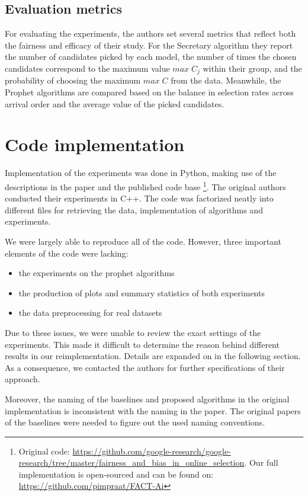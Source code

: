 \subsection{Evaluation metrics}\label{section:evluation_metrics}
For evaluating the experiments, the authors set several metrics that reflect both the fairness and efficacy of their study. For the Secretary algorithm they report the number of candidates picked by each model, the number of times the chosen candidates correspond to the maximum value $max\;C_j$ within their group, and the probability of choosing the maximum $max\;C$ from the data. Meanwhile, the Prophet algorithms are compared based on the balance in selection rates across arrival order and the average value of the picked candidates.


\section{Code implementation}
Implementation of the experiments was done in Python, making use of the descriptions in the paper and the published code base \footnote{Original code:  \url{https://github.com/google-research/google-research/tree/master/fairness_and_bias_in_online_selection}. Our full implementation is open-sourced and can be found on: \url{https://github.com/pimpraat/FACT-Ai}}. The original authors conducted their experiments in C++. The code was factorized neatly into different files for retrieving the data, implementation of algorithms and experiments.

We were largely able to reproduce all of the code. However, three important elements of the code were lacking:
\begin{itemize}
    \item the experiments on the prophet algorithms
    \item the production of plots and summary statistics of both experiments
    \item the data preprocessing for real datasets
\end{itemize}
Due to these issues, we were unable to review the exact settings of the experiments. This made it difficult to determine the reason behind different results in our reimplementation. Details are expanded on in the following section. As a consequence, we contacted the authors for further specifications of their approach.

Moreover, the naming of the baselines and proposed algorithms in the original implementation is inconsistent with the naming in the paper. The original papers of the baselines were needed to figure out the used naming conventions.

